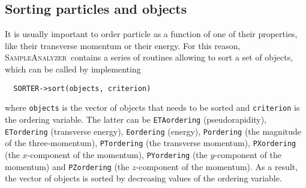 \documentclass[a4paper]{article}
\newcommand{\spla}{\textsc{SampleAnalyzer}}
\begin{document}
\vspace{2cm}
\begin{shaded}
\section{\Large Sorting particles and objects}
\end{shaded}

\noindent It is usually important to order particle as a function of one of their
properties, like their transverse momentum or their energy. For this reason,
\spla\ contains a series of routines allowing to sort a set of objects, which
can be called by implementing\\
{\color{ao}
\begin{verbatim}
  SORTER->sort(objects, criterion)
\end{verbatim}}
\noindent where {\color{ao}\verb+objects+} is the vector of objects that needs to be sorted and
\verb+criterion+ is the ordering variable. The latter can be {\color{ao}\verb+ETAordering+}
(pseudorapidity), {\color{ao}\verb+ETordering+} (transverse energy), {\color{ao}\verb+Eordering+}
(energy), {\color{ao}\verb+Pordering+} (the magnitude of the three-momentum),
{\color{ao}\verb+PTordering+} (the transverse momentum), {\color{ao}\verb+PXordering+} (the
$x$-component of the momentum), {\color{ao}\verb+PYordering+} (the $y$-component of the
momentum) and {\color{ao}\verb+PZordering+} (the $z$-component of the momentum). As a
result, the vector of objects is sorted by decreasing values of the ordering
variable.

\newpage


\end{document}
